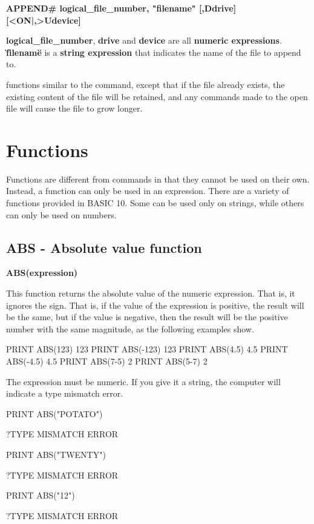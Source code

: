 {\bf APPEND# logical\_file\_number, "filename" [,Ddrive] [<ON|,>Udevice] }

{\bf logical\_file\_number}, {\bf drive} and {\bf device} are all {\bf numeric expressions}.
{\bf \"filename\"} is a {\bf string expression} that indicates the name of the file to append to.

 functions similar to the  command, except that if the file already
exists, the existing content of the file will be retained, and any  commands made to the
open file will cause the file to grow longer.


\section{Functions}

Functions are different from commands in that they cannot be used on their own.
Instead, a function can only be used in an expression.
There are a variety of functions provided in BASIC 10.
Some can be used only on strings, while others can only be used on numbers.

\subsection{ABS - Absolute value function}

{\bf ABS(expression)}

This function returns the absolute value of the numeric expression.
That is, it ignores the sign.  That is, if the value of the expression is positive,
the result will be the same, but if the value is negative, then the result
will be the positive number with the same magnitude, as the following examples show.

\begin{screenoutput}
  PRINT ABS(123)
  123
  PRINT ABS(-123)
  123
  PRINT ABS(4.5)
  4.5
  PRINT ABS(-4.5)
  4.5
  PRINT ABS(7-5)
  2
  PRINT ABS(5-7)
  2
\end{screenoutput}

The expression must be numeric. If you give it a string, the computer will indicate a type mismatch error.

\begin{screenoutput}
  PRINT ABS("POTATO")

  ?TYPE MISMATCH ERROR

  PRINT ABS("TWENTY")

  ?TYPE MISMATCH ERROR

  PRINT ABS("12")

  ?TYPE MISMATCH ERROR
\end{screenoutput}

